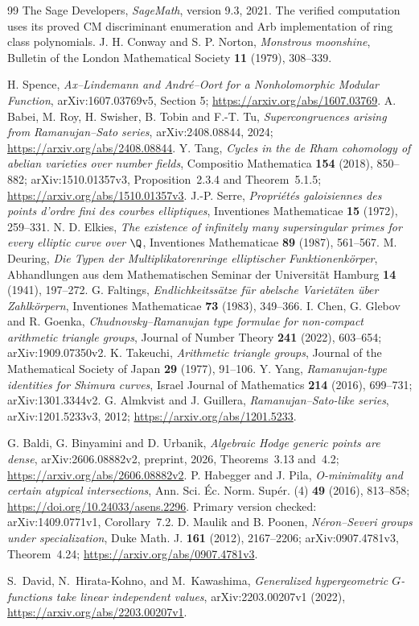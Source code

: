 \begin{thebibliography}{99}
 The Sage Developers, \emph{SageMath}, version 9.3, 2021.
The verified computation uses its proved CM discriminant enumeration
and Arb implementation of ring class polynomials.
 J. H. Conway and S. P. Norton,
\emph{Monstrous moonshine}, Bulletin of the London Mathematical Society
\textbf{11} (1979), 308--339.
 \raggedright H. Spence,
\emph{Ax--Lindemann and Andr\'e--Oort for a Nonholomorphic Modular Function},
arXiv:1607.03769v5, Section 5;
\url{https://arxiv.org/abs/1607.03769}.
 A. Babei, M. Roy, H. Swisher, B. Tobin and F.-T. Tu,
\emph{Supercongruences arising from Ramanujan--Sato series},
arXiv:2408.08844, 2024;
\url{https://arxiv.org/abs/2408.08844}.
 Y. Tang,
\emph{Cycles in the de Rham cohomology of abelian varieties over number fields},
Compositio Mathematica \textbf{154} (2018), 850--882;
arXiv:1510.01357v3, Proposition~2.3.4 and Theorem~5.1.5;
\url{https://arxiv.org/abs/1510.01357v3}.
 J.-P. Serre,
\emph{Propri\'et\'es galoisiennes des points d'ordre fini des courbes
elliptiques}, Inventiones Mathematicae \textbf{15} (1972), 259--331.
 N. D. Elkies,
\emph{The existence of infinitely many supersingular primes for every
elliptic curve over $\Q$}, Inventiones Mathematicae
\textbf{89} (1987), 561--567.
 M. Deuring,
\emph{Die Typen der Multiplikatorenringe elliptischer Funktionenk\"orper},
Abhandlungen aus dem Mathematischen Seminar der Universit\"at Hamburg
\textbf{14} (1941), 197--272.
 G. Faltings,
\emph{Endlichkeitss\"atze f\"ur abelsche Variet\"aten \"uber Zahlk\"orpern},
Inventiones Mathematicae \textbf{73} (1983), 349--366.
 I. Chen, G. Glebov and R. Goenka,
\emph{Chudnovsky--Ramanujan type formulae for non-compact arithmetic
triangle groups}, Journal of Number Theory \textbf{241} (2022), 603--654;
arXiv:1909.07350v2.
 K. Takeuchi,
\emph{Arithmetic triangle groups}, Journal of the Mathematical Society
of Japan \textbf{29} (1977), 91--106.
 Y. Yang, \emph{Ramanujan-type identities for Shimura curves},
Israel Journal of Mathematics \textbf{214} (2016), 699--731;
arXiv:1301.3344v2.
 G. Almkvist and J. Guillera,
\emph{Ramanujan--Sato-like series}, arXiv:1201.5233v3, 2012;
\url{https://arxiv.org/abs/1201.5233}.

G. Baldi, G. Binyamini and D. Urbanik,
\emph{Algebraic Hodge generic points are dense},
arXiv:2606.08882v2, preprint, 2026, Theorems~3.13 and~4.2;
\url{https://arxiv.org/abs/2606.08882v2}.
P. Habegger and J. Pila,
\emph{O-minimality and certain atypical intersections},
Ann. Sci. \'Ec. Norm. Sup\'er. (4) \textbf{49} (2016), 813--858;
\url{https://doi.org/10.24033/asens.2296}.
Primary version checked: arXiv:1409.0771v1, Corollary~7.2.
D. Maulik and B. Poonen,
\emph{N\'eron--Severi groups under specialization},
Duke Math. J. \textbf{161} (2012), 2167--2206;
arXiv:0907.4781v3, Theorem~4.24;
\url{https://arxiv.org/abs/0907.4781v3}.

S.~David, N.~Hirata-Kohno, and M.~Kawashima,
\emph{Generalized hypergeometric $G$-functions take linear independent values},
arXiv:2203.00207v1 (2022),
\url{https://arxiv.org/abs/2203.00207v1}.

\end{thebibliography}